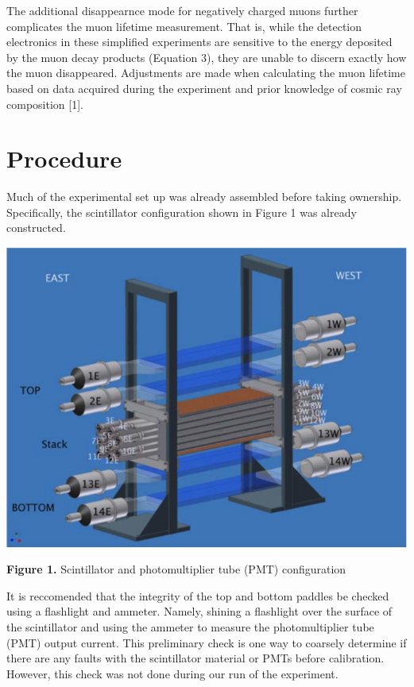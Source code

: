\documentclass{article}
\begin{document}
The additional disappearnce mode for negatively charged muons further complicates the muon lifetime measurement. That is, while the detection electronics in these simplified experiments are sensitive to the energy deposited by the muon decay products (Equation 3), they are unable to discern exactly how the muon disappeared. Adjustments are made when calculating the muon lifetime based on data acquired during the experiment and prior knowledge of cosmic ray composition [1]. %

\section*{Procedure}
\hspace{3.5mm} Much of the experimental set up was already assembled before taking ownership. Specifically, the scintillator configuration shown in Figure 1 was already constructed.

\begin{center}

    \vspace{5mm}

    \includegraphics[width = \textwidth]{Figure1.png}

    \vspace{5mm}

    \textbf{Figure 1.} Scintillator and photomultiplier tube (PMT) configuration

\end{center}

It is reccomended that the integrity of the top and bottom paddles be checked using a flashlight and ammeter. Namely, shining a flashlight over the surface of the scintillator and using the ammeter to measure the photomultiplier tube (PMT) output current. This preliminary check is one way to coarsely determine if there are any faults with the scintillator material or PMTs before calibration. However, this check was not done during our run of the experiment.
\end{document}
